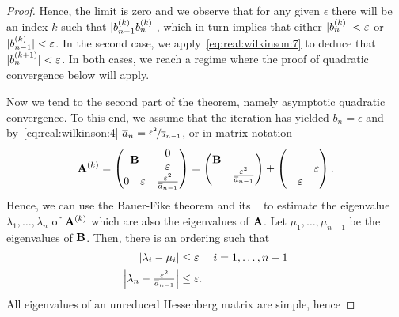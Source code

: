 \begin{proof}
Hence, the limit is zero and we observe that for any given $\epsilon$
there will be an index $k$ such that $\abs{b_{n-1}^{(k)}b_{n}^{(k)}}$,
which in turn implies that either $\abs{b_{n}^{(k)}}<\epsilon$ or
$\abs{b_{n-1}^{(k)}}<\epsilon$. In the second case, we
apply~\eqref{eq:real:wilkinson:7} to deduce that
$\abs{b_{n}^{(k+1)}}<\epsilon$. In both cases, we reach a regime where
the proof of quadratic convergence below will apply.

Now we tend to the second part of the theorem, namely asymptotic
quadratic convergence. To this end, we assume that the iteration has
yielded $b_n=\epsilon$ and by~\eqref{eq:real:wilkinson:4}
$\overline a_n = \nicefrac{\epsilon^2}{\overline a_{n-1}}$, or in
matrix notation
\begin{gather}
  \mata^{(k)} =
  \begin{pmatrix}
    \matb &
    \begin{matrix}
      0\\ \epsilon
    \end{matrix}
    \\
    \begin{matrix}
      0 & \epsilon
    \end{matrix}
    & \frac{\epsilon^2}{\overline a_{n-1}}
  \end{pmatrix}
  =
  \begin{pmatrix}
    \matb&\\&\frac{\epsilon^2}{\overline a_{n-1}}
  \end{pmatrix}
  +
  \begin{pmatrix}
    \\
    &&\epsilon\\
    &\epsilon
  \end{pmatrix}
  .
\end{gather}
Hence, we can use the Bauer-Fike theorem and its
~ to estimate the
eigenvalue $\lambda_1,\dots,\lambda_n$ of $\mata^{(k)}$ which are also
the eigenvalues of $\mata$. Let $\mu_1,\dots,\mu_{n-1}$ be the
eigenvalues of $\matb$. Then, there is an ordering such that
\begin{gather}
  \begin{aligned}
  \abs*{\lambda_i-\mu_i} & \le \epsilon & i&=1,\dots,n-1\\
  \abs*{\lambda_n - \tfrac{\epsilon^2}{\overline a_{n-1}}} &\le\epsilon.
  \end{aligned}
\end{gather}
All eigenvalues of an unreduced Hessenberg matrix are simple, hence

\end{proof}
